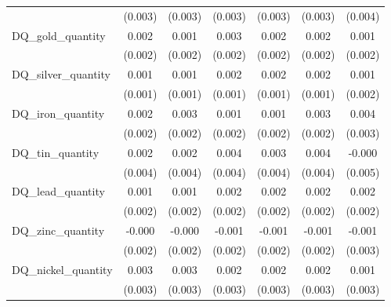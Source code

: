 \begin{table}[htbp]
\begin{tabular}{l*{6}{c}}
            &     (0.003)       &     (0.003)       &     (0.003)       &     (0.003)       &     (0.003)       &     (0.004)       \\
[1em]
DQ\_gold\_quantity&       0.002       &       0.001       &       0.003       &       0.002       &       0.002       &       0.001       \\
            &     (0.002)       &     (0.002)       &     (0.002)       &     (0.002)       &     (0.002)       &     (0.002)       \\
[1em]
DQ\_silver\_quantity&       0.001       &       0.001       &       0.002       &       0.002       &       0.002       &       0.001       \\
            &     (0.001)       &     (0.001)       &     (0.001)       &     (0.001)       &     (0.001)       &     (0.002)       \\
[1em]
DQ\_iron\_quantity&       0.002       &       0.003       &       0.001       &       0.001       &       0.003       &       0.004       \\
            &     (0.002)       &     (0.002)       &     (0.002)       &     (0.002)       &     (0.002)       &     (0.003)       \\
[1em]
DQ\_tin\_quantity&       0.002       &       0.002       &       0.004       &       0.003       &       0.004       &      -0.000       \\
            &     (0.004)       &     (0.004)       &     (0.004)       &     (0.004)       &     (0.004)       &     (0.005)       \\
[1em]
DQ\_lead\_quantity&       0.001       &       0.001       &       0.002       &       0.002       &       0.002       &       0.002       \\
            &     (0.002)       &     (0.002)       &     (0.002)       &     (0.002)       &     (0.002)       &     (0.002)       \\
[1em]
DQ\_zinc\_quantity&      -0.000       &      -0.000       &      -0.001       &      -0.001       &      -0.001       &      -0.001       \\
            &     (0.002)       &     (0.002)       &     (0.002)       &     (0.002)       &     (0.002)       &     (0.003)       \\
[1em]
DQ\_nickel\_quantity&       0.003       &       0.003       &       0.002       &       0.002       &       0.002       &       0.001       \\
            &     (0.003)       &     (0.003)       &     (0.003)       &     (0.003)       &     (0.003)       &     (0.003)       \\

\end{tabular}
\end{table}
